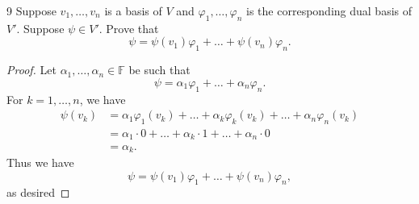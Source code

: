 \documentclass[11pt]{extarticle}
\newenvironment{problem}[1]{\begin{prob*}{#1}{}}{\end{prob*}}
\newcommand{\F}{\mathbb{F}}
\begin{document}
\begin{problem}{9}
Suppose $v_1,\dots, v_n$ is a basis of $V$ and $\varphi_1,\dots,\varphi_n$ is the corresponding dual basis of $V'$.  Suppose $\psi\in V'$.  Prove that 
\begin{equation*}
\psi = \psi(v_1)\varphi_1 + \dots + \psi(v_n)\varphi_n.
\end{equation*}
\end{problem}
\begin{proof}
Let $\alpha_1,\dots,\alpha_n\in\F$ be such that
\begin{equation*}
\psi = \alpha_1\varphi_1 + \dots + \alpha_n\varphi_n.
\end{equation*}
For $k = 1,\dots, n$, we have
\begin{align*}
\psi(v_k) &= \alpha_1\varphi_1(v_k) + \dots + \alpha_k\varphi_k(v_k) + \dots + \alpha_n\varphi_n(v_k)\\
&= \alpha_1\cdot 0 + \dots + \alpha_k\cdot 1 + \dots + \alpha_n\cdot 0\\
&= \alpha_k.
\end{align*}
Thus we have
\begin{equation*}
\psi = \psi(v_1)\varphi_1 + \dots + \psi(v_n)\varphi_n,
\end{equation*}
as desired
\end{proof}
\end{document}
